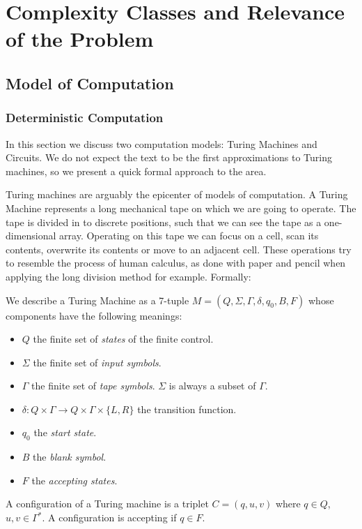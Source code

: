 \chapter{Complexity Classes and Relevance of the Problem}
\section{Model of Computation}

\subsection{Deterministic Computation}
In this section we discuss two computation models: Turing Machines and Circuits. We do not expect the text to be the first approximations to Turing machines, so we present a quick formal approach to the area. 

Turing machines are arguably the epicenter of  models of computation. A Turing Machine  represents a long mechanical tape on which we are going to operate. The tape is divided in to discrete positions, such that we can see the tape as a one-dimensional array. Operating on this tape we can focus on a cell, scan its contents, overwrite  its contents or move to an adjacent cell. These operations try to resemble the process of human calculus, as done with paper and pencil when applying the long division method  for example. Formally:

\begin{definition} We describe a Turing Machine as a 7-tuple $M=(Q, \Sigma, \Gamma, \delta, q_0, B, F)$ whose components have the following meanings:
  \begin{itemize}
  \item $Q$ the finite set of \emph{states} of the finite control.
  \item $\Sigma$ the finite set of \emph{input symbols}.
  \item $\Gamma$ the finite set of \emph{tape symbols}. $\Sigma$ is always a subset of $\Gamma$.
  \item  $\delta: Q\times \Gamma \to Q\times\Gamma\times\{L,R\}$ the transition function.
  \item $q_0$ the \emph{start state}.
  \item $B$ the \emph{blank symbol}.
  \item $F$ the \emph{accepting states}.
  \end{itemize}

  A configuration of a Turing machine is a triplet $C=(q,u,v)$ where $q\in Q$, $u,v\in \Gamma^*$. A configuration is accepting if $q\in F$.
\end{definition}

